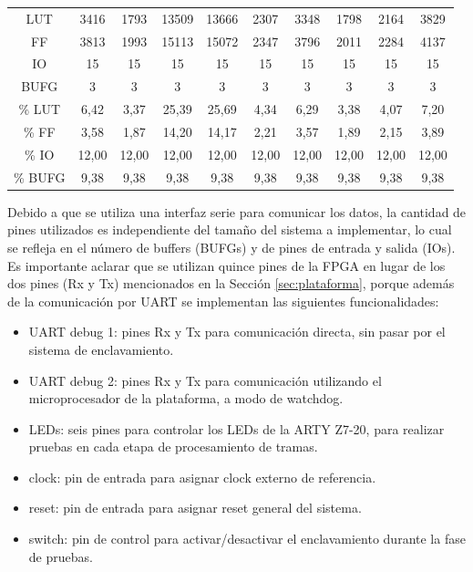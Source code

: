 \begin{table}[H]
{\begin{center}
{\begin{tabular}{ c c c c c c c c c c  }
						LUT 			& 3416  & 1793  & 13509 & 13666 & 2307  & 3348  & 1798  & 2164  & 3829\\
						FF 				& 3813  & 1993  & 15113 & 15072 & 2347  & 3796  & 2011  & 2284  & 4137\\
						IO 				& 15    & 15    & 15    & 15    & 15    & 15    & 15    & 15    & 15\\
						BUFG 			& 3     & 3     & 3     & 3     & 3     & 3     & 3     & 3     & 3\\
						\hline
						\% LUT 			& 6,42  & 3,37  & 25,39 & 25,69 & 4,34  & 6,29  & 3,38  & 4,07  & 7,20\\
						\% FF 			& 3,58  & 1,87  & 14,20 & 14,17 & 2,21  & 3,57  & 1,89  & 2,15  & 3,89\\
						\% IO 			& 12,00 & 12,00 & 12,00 & 12,00 & 12,00 & 12,00 & 12,00 & 12,00 & 12,00\\
						\% BUFG 		& 9,38  & 9,38  & 9,38  & 9,38  & 9,38  & 9,38  & 9,38  & 9,38  & 9,38\\
					\end{tabular}
				}
			\end{center}
		}    
	\end{table}
	
	Debido a que se utiliza una interfaz serie para comunicar los datos, la cantidad de pines utilizados es independiente del tamaño del sistema a implementar, lo cual se refleja en el número de buffers (BUFGs) y de pines de entrada y salida (IOs). 
	Es importante aclarar que se utilizan quince pines de la FPGA en lugar de los dos pines (Rx y Tx) mencionados en la Sección \ref{sec:plataforma}, porque además de la comunicación por UART se implementan las siguientes funcionalidades:
	
	\begin{itemize}
		\item UART debug 1: pines Rx y Tx para comunicación directa, sin pasar por el sistema de enclavamiento.
		\item UART debug 2: pines Rx y Tx para comunicación utilizando el microprocesador de la plataforma, a modo de watchdog.
		\item LEDs: seis pines para controlar los LEDs de la ARTY Z7-20, para realizar pruebas en cada etapa de procesamiento de tramas.
		\item clock: pin de entrada para asignar clock externo de referencia.
		\item reset: pin de entrada para asignar reset general del sistema.
		\item switch: pin de control para activar/desactivar el enclavamiento durante la fase de pruebas.	
	\end{itemize}

